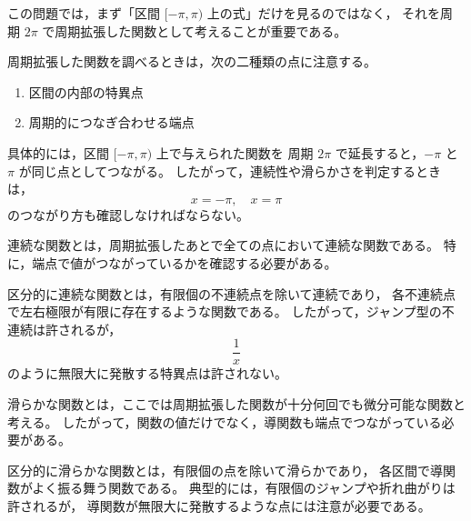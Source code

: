 \begin{background}
	この問題では，まず「区間 \([-\pi,\pi)\) 上の式」だけを見るのではなく，
	それを周期 \(2\pi\) で周期拡張した関数として考えることが重要である。
	
	周期拡張した関数を調べるときは，次の二種類の点に注意する。
	
	\begin{enumerate}
		\item 区間の内部の特異点
		\item 周期的につなぎ合わせる端点
	\end{enumerate}
	
	具体的には，区間 \([-\pi,\pi)\) 上で与えられた関数を
	周期 \(2\pi\) で延長すると，\(-\pi\) と \(\pi\) が同じ点としてつながる。
	したがって，連続性や滑らかさを判定するときは，
	\[
	x=-\pi,\quad x=\pi
	\]
	のつながり方も確認しなければならない。
	
	\medskip
	
	連続な関数とは，周期拡張したあとで全ての点において連続な関数である。
	特に，端点で値がつながっているかを確認する必要がある。
	
	区分的に連続な関数とは，有限個の不連続点を除いて連続であり，
	各不連続点で左右極限が有限に存在するような関数である。
	したがって，ジャンプ型の不連続は許されるが，
	\[
	\frac{1}{x}
	\]
	のように無限大に発散する特異点は許されない。
	
	滑らかな関数とは，ここでは周期拡張した関数が十分何回でも微分可能な関数と考える。
	したがって，関数の値だけでなく，導関数も端点でつながっている必要がある。
	
	区分的に滑らかな関数とは，有限個の点を除いて滑らかであり，
	各区間で導関数がよく振る舞う関数である。
	典型的には，有限個のジャンプや折れ曲がりは許されるが，
	導関数が無限大に発散するような点には注意が必要である。
\end{background}
